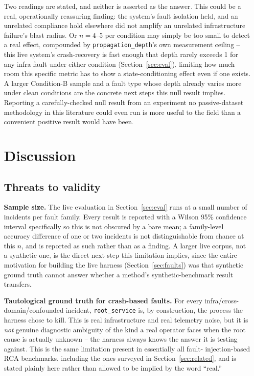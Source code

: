 \documentclass[conference]{IEEEtran}
\begin{document}
Two readings are stated, and neither is asserted as the answer. This
could be a real, operationally reassuring finding: the system's fault
isolation held, and an unrelated compliance hold elsewhere did not
amplify an unrelated infrastructure failure's blast radius. Or $n=4$--$5$
per condition may simply be too small to detect a real effect, compounded
by \texttt{propagation\_depth}'s own measurement ceiling -- this live
system's crash-recovery is fast enough that depth rarely exceeds 1 for
any infra fault under either condition (Section~\ref{sec:eval}), limiting
how much room this specific metric has to show a state-conditioning
effect even if one exists. A larger Condition-B sample and a fault type
whose depth already varies more under clean conditions are the concrete
next steps this null result implies. Reporting a carefully-checked null
result from an experiment no passive-dataset methodology in this
literature could even run is more useful to the field than a convenient
positive result would have been.

\section{Discussion}
\label{sec:discussion}

\subsection{Threats to validity}
\label{sec:threats}

\textbf{Sample size.} The live evaluation in Section~\ref{sec:eval} runs at
a small number of incidents per fault family. Every result is reported with
a Wilson 95\% confidence interval specifically so this is not obscured by a
bare mean; a family-level accuracy difference of one or two incidents is
not distinguishable from chance at this $n$, and is reported as such rather
than as a finding. A larger live corpus, not a synthetic one, is the direct
next step this limitation implies, since the entire motivation for building
the live harness (Section~\ref{sec:faults}) was that synthetic ground truth
cannot answer whether a method's synthetic-benchmark result transfers.

\textbf{Tautological ground truth for crash-based faults.} For every
infra/cross-domain/confounded incident, \texttt{root\_service} is, by
construction, the process the harness chose to kill. This is real
infrastructure and real telemetry noise, but it is \emph{not} genuine
diagnostic ambiguity of the kind a real operator faces when the root cause
is actually unknown -- the harness always knows the answer it is testing
against. This is the same limitation present in essentially all fault-
injection-based RCA benchmarks, including the ones surveyed in
Section~\ref{sec:related}, and is stated plainly here rather than allowed
to be implied by the word ``real.''
\end{document}
